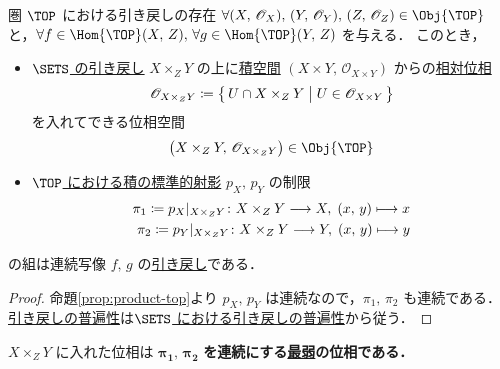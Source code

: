 \documentclass[geometry_main]{subfiles}
\begin{document}
\begin{myprop}[label=prop:pullback-top]{圏 $\TOP$ における引き戻しの存在}
	$\forall (X,\, \mathscr{O}_X),\, (Y,\, \mathscr{O}_Y),\, \phase{Z} \in \Obj{\TOP}$ と，$\forall f \in \Hom{\TOP}(X,\, Z),\, \forall g \in \Hom{\TOP}(Y,\, Z)$ を与える．
	このとき，
	\begin{itemize}
		\item \hyperref[prop:pullback-sets]{$\SETS$ の引き戻し} $X \times_Z Y$ の上に\hyperref[prop:product-top]{積空間} $(X \times Y,\, \mathscr{O}_{X \times Y})$ からの\hyperref[def.reltopo]{相対位相}
		\begin{align}
			\mathscr{O}_{X \times_Z Y} \coloneqq \bigl\{\, U \cap X \times_Z Y \bigm| U \in \mathscr{O}_{X \times Y} \,\bigr\} 
		\end{align}
		を入れてできる位相空間
		\begin{align}
			\bigl( X \times_Z Y,\, \mathscr{O}_{X \times_Z Y} \bigr) \in \Obj{\TOP}
		\end{align}
		\item \hyperref[prop:product-top]{$\TOP$ における積の標準的射影} $p_X,\, p_Y$ の制限
		\begin{align}
			\pi_1 \coloneqq p_X|_{X \times_Z Y} \colon X \times_Z Y \longrightarrow X,\; (x,\, y) \longmapsto x \\
			\pi_2 \coloneqq p_Y|_{X \times_Z Y} \colon X \times_Z Y \longrightarrow Y,\; (x,\, y) \longmapsto y
		\end{align}
	\end{itemize}
	の組は連続写像 $f,\, g$ の\hyperref[def:pullback]{引き戻し}である．
\end{myprop}

\begin{proof}
	命題\ref{prop:product-top}より $p_X,\, p_Y$ は連続なので，$\pi_1,\, \pi_2$ も連続である．\hyperref[cmtd:pullback]{引き戻しの普遍性}は\hyperref[prop:pullback-sets]{$\SETS$ における引き戻しの普遍性}から従う．
\end{proof}

\begin{marker}\label{remark:pullback}
	$X \times_Z Y$ に入れた位相は $\bm{\pi_1},\, \bm{\pi_2}$ \textbf{を連続にする\hyperref[def.intensity_topo]{最弱}の位相である．}
\end{marker}

\end{document}
